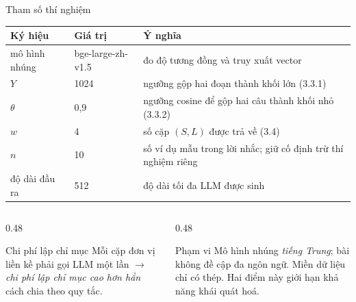\documentclass[aspectratio=169,10pt]{beamer}
\newcommand{\src}[1]{{\footnotesize\ttfamily #1}}
\begin{document}
\begin{frame}{Tham số thí nghiệm}
  \begin{center}
  \setlength{\tabcolsep}{4pt}
  \begin{tabular}{@{}p{2.4cm}p{2.7cm}p{5.0cm}@{}}
    \toprule
    \textbf{Ký hiệu} & \textbf{Giá trị} & \textbf{Ý nghĩa} \\
    \midrule
    mô hình nhúng & \src{bge-large-zh-v1.5} & đo độ tương đồng và truy xuất vector \\
    $Y$ & 1024 & ngưỡng gộp hai đoạn thành khối lớn (3.3.1) \\
    $\theta$ & 0{,}9 & ngưỡng cosine để gộp hai câu thành khối nhỏ (3.3.2) \\
    $w$ & 4 & số cặp $(S,L)$ được trả về (3.4) \\
    $n$ & 10 & số ví dụ mẫu trong lời nhắc; giữ cố định trừ thí nghiệm riêng \\
    độ dài đầu ra & 512 & độ dài tối đa LLM được sinh \\
    \bottomrule
  \end{tabular}
  \end{center}
  \vspace{0.1em}
  \begin{columns}[T]
    \begin{column}{0.48\textwidth}
      \begin{alertblock}{\small Chi phí lập chỉ mục}
        \small Mỗi cặp đơn vị liền kề phải gọi LLM một lần $\rightarrow$ \emph{chi phí
        lập chỉ mục cao hơn hẳn} cách chia theo quy tắc.
      \end{alertblock}
    \end{column}
    \begin{column}{0.48\textwidth}
      \begin{block}{\small Phạm vi}
        \small Mô hình nhúng \emph{tiếng Trung}; bài không đề cập đa ngôn ngữ. Miền dữ liệu
        chỉ có thép. Hai điểm này giới hạn khả năng khái quát hoá.
      \end{block}
    \end{column}
  \end{columns}
\end{frame}
\end{document}
